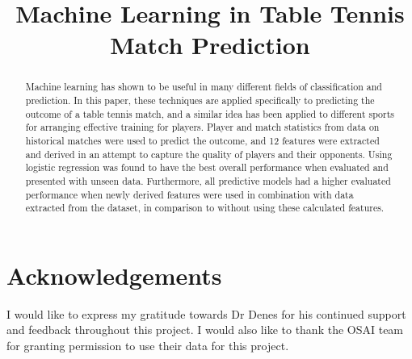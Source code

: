 \documentclass[conference]{IEEEtran}
\title{Machine Learning in Table Tennis Match Prediction}
\author{\IEEEauthorblockN{Sophie Chiang}}
\begin{document}
\maketitle
\thispagestyle{plain}
\pagestyle{plain}

\begin{abstract}
Machine learning has shown to be useful in many different fields of classification and prediction. In this paper, these techniques are applied specifically to predicting the outcome of a table tennis match, and a similar idea has been applied to different sports for arranging effective training for players. Player and match statistics from data on historical matches were used to predict the outcome, and 12 features were extracted and derived in an attempt to capture the quality of players and their opponents. Using logistic regression was found to have the best overall performance when evaluated and presented with unseen data. Furthermore, all predictive models had a higher evaluated performance when newly derived features were used in combination with data extracted from the dataset, in comparison to without using these calculated features.
\end{abstract}










\section*{Acknowledgements}
I would like to express my gratitude towards Dr Denes for his continued support and feedback throughout this project. I would also like to thank the OSAI team for granting permission to use their data for this project.



\end{document}
